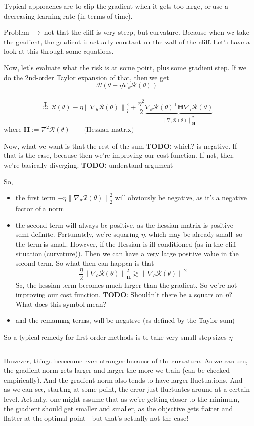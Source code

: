 \documentclass[a2paper,4pt]{extarticle}
\newcommand{\cR}{\mathcal{R}}
\newcommand{\norm}[1]{\left\lVert #1 \right\rVert}
\newcommand*{\T}{\mathsf{T}}
\newcommand{\mat}[1]{\mathbf{#1}}
\newcommand{\MH}{\mat{H}}
\newcommand{\todo}[1]{\textbf{TODO:} #1}
\newcommand{\todo}[1]{%
}
\newcommand{\sep}{\vspace{0pt}\noindent\hrule\vspace{0pt}}
\newcommand{\sep}{\vspace{5pt}\noindent\hrule\vspace{5pt}}
\begin{document}
\begin{landscape}
\begin{multicols*}{7}
Typical approaches are to clip the gradient when it gets too large, or use a
decreasing learning rate (in terms of time).

Problem $\rightarrow$ not that the cliff is very steep, but curvature. 
Because when we take the gradient, the gradient is actually constant
on the wall of the cliff. Let's have a look at this through some equations.

Now, let's evaluate what the risk is at some point, plus some gradient step. If
we do the 2nd-order Taylor expansion of that, then we get
\[
\cR(\theta-\eta\nabla_{\theta}\cR(\theta))
\] \\
\[
\stackrel{\text{T}}{\approx}
\cR(\theta)
-\eta\norm{\nabla_\theta\cR(\theta)}_2^2
+
\frac{\eta^2}{2}
\underbrace{
\nabla_{\theta}\cR(\theta)^\T\MH
\nabla_{\theta}\cR(\theta)
}_{\norm{\nabla_\theta\cR(\theta)}_{\MH}^2}
\]
where
$
\MH:=\nabla^2\cR(\theta)
\qquad
\text{(Hessian matrix)}$


Now, what we want is that the rest of the sum \todo{which?} is negative. If that
is the case, because then we're improving our cost function. If not, then we're
basically diverging. \todo{understand argument}

So,
\begin{itemize}
  \item the first term $-\eta\norm{\nabla_\theta\cR(\theta)}_2^2$ will obviously
  be negative, as it's a negative factor of a norm
  \item the second term will always be positive, as the hessian matrix is
  positive semi-definite. Fortunately, we're squaring $\eta$, which may be
  already small, so the term is small. However, if the Hessian is
  ill-conditioned (as in the cliff-situation (curvature)). Then we can have a
  very large positive value in the second term. So what then can happen is that
  \[
  \frac{\eta}{2}\norm{\nabla_\theta\cR(\theta)}_{\MH}^2
  \gtrsim
  \norm{\nabla_\theta\cR(\theta)}^2
  \]
  So, the hessian term becomes much larger than the gradient. So we're not
  improving our cost function.
  \todo{Shouldn't there be a square on $\eta$? What does this symbol mean?}
  \item and the remaining terms, will be negative (as defined by the Taylor sum)
\end{itemize}

So a typical remedy for first-order methods is to take very small step sizes
$\eta$.

\sep

However, things bececome even stranger because of the curvature. As we can see,
the gradient norm gets larger and larger the more we train (can be checked
empirically). And the gradient norm also tends to have larger fluctuations. And
as we can see, starting at some point, the error just fluctuates around at a
certain level. Actually, one might assume that as we're getting closer to the
minimum, the gradient should get smaller and smaller, as the objective gets
flatter and flatter at the optimal point - but that's actually not the case!


\end{multicols*}
\end{landscape}
\end{document}
